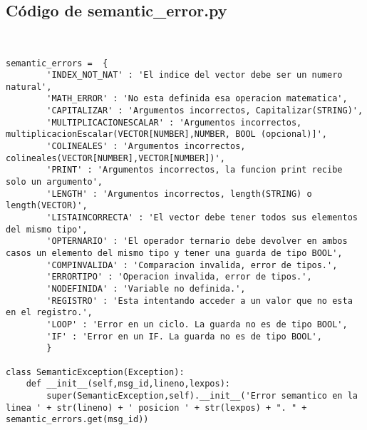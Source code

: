 \subsection{Código de semantic\_error.py}

\begin{verbatim}


semantic_errors =  {
        'INDEX_NOT_NAT' : 'El indice del vector debe ser un numero natural',
        'MATH_ERROR' : 'No esta definida esa operacion matematica',
        'CAPITALIZAR' : 'Argumentos incorrectos, Capitalizar(STRING)',
        'MULTIPLICACIONESCALAR' : 'Argumentos incorrectos, multiplicacionEscalar(VECTOR[NUMBER],NUMBER, BOOL (opcional)]',
        'COLINEALES' : 'Argumentos incorrectos, colineales(VECTOR[NUMBER],VECTOR[NUMBER])',
        'PRINT' : 'Argumentos incorrectos, la funcion print recibe solo un argumento',
        'LENGTH' : 'Argumentos incorrectos, length(STRING) o length(VECTOR)',
        'LISTAINCORRECTA' : 'El vector debe tener todos sus elementos del mismo tipo',
        'OPTERNARIO' : 'El operador ternario debe devolver en ambos casos un elemento del mismo tipo y tener una guarda de tipo BOOL',
        'COMPINVALIDA' : 'Comparacion invalida, error de tipos.',
        'ERRORTIPO' : 'Operacion invalida, error de tipos.',
        'NODEFINIDA' : 'Variable no definida.',
        'REGISTRO' : 'Esta intentando acceder a un valor que no esta en el registro.',
        'LOOP' : 'Error en un ciclo. La guarda no es de tipo BOOL',
        'IF' : 'Error en un IF. La guarda no es de tipo BOOL',
        }

class SemanticException(Exception):
    def __init__(self,msg_id,lineno,lexpos):
        super(SemanticException,self).__init__('Error semantico en la linea ' + str(lineno) + ' posicion ' + str(lexpos) + ". " + semantic_errors.get(msg_id))

\end{verbatim}